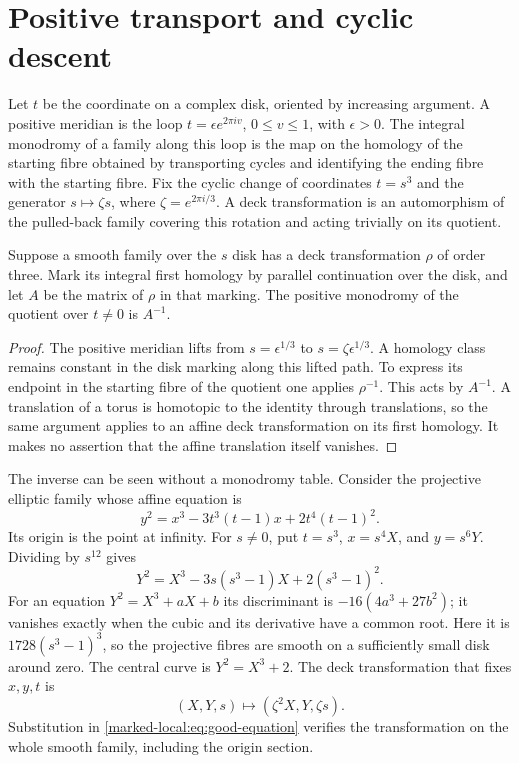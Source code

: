 
\section{Positive transport and cyclic descent}

Let $t$ be the coordinate on a complex disk, oriented by increasing
argument. A positive meridian is the loop $t=\epsilon e^{2\pi iv}$,
$0\le v\le1$, with $\epsilon>0$. The integral monodromy of a family
along this loop is the map on the homology of the starting fibre
obtained by transporting cycles and identifying the ending fibre
with the starting fibre. Fix the cyclic change of coordinates $t=s^3$
and the generator $s\mapsto\zeta s$, where
$\zeta=e^{2\pi i/3}$. A deck transformation is an automorphism of
the pulled-back family covering this rotation and acting trivially
on its quotient.

\begin{lemma}\label{marked-local:lem:inverse-descent}
Suppose a smooth family over the $s$ disk has a deck transformation
$\rho$ of order three. Mark its integral first homology by parallel
continuation over the disk, and let $A$ be the matrix of $\rho$ in
that marking. The positive monodromy of the quotient over $t\ne0$
is $A^{-1}$.
\end{lemma}
\begin{proof}
The positive meridian lifts from $s=\epsilon^{1/3}$ to
$s=\zeta\epsilon^{1/3}$. A homology class remains constant in the
disk marking along this lifted path. To express its endpoint in the
starting fibre of the quotient one applies $\rho^{-1}$. This acts
by $A^{-1}$. A translation of a torus is homotopic to the identity
through translations, so the same argument applies to an affine
deck transformation on its first homology. It makes no assertion
that the affine translation itself vanishes.
\end{proof}

The inverse can be seen without a monodromy table. Consider the
projective elliptic family whose affine equation is
\begin{equation}\label{marked-local:eq:weierstrass}
 y^2=x^3-3t^3(t-1)x+2t^4(t-1)^2.
\end{equation}
Its origin is the point at infinity. For $s\ne0$, put
$t=s^3$, $x=s^4X$, and $y=s^6Y$. Dividing by $s^{12}$ gives
\begin{equation}\label{marked-local:eq:good-equation}
 Y^2=X^3-3s(s^3-1)X+2(s^3-1)^2.
\end{equation}
For an equation $Y^2=X^3+aX+b$ its discriminant is
$-16(4a^3+27b^2)$; it vanishes exactly when the cubic and its
derivative have a common root. Here it is
$1728(s^3-1)^3$, so the projective fibres are smooth on a
sufficiently small disk around zero. The central curve is
$Y^2=X^3+2$. The deck transformation that fixes $x,y,t$ is
\begin{equation}\label{marked-local:eq:actual-elliptic-deck}
 (X,Y,s)\longmapsto(\zeta^2X,Y,\zeta s).
\end{equation}
Substitution in \eqref{marked-local:eq:good-equation} verifies the transformation
on the whole smooth family, including the origin section.

